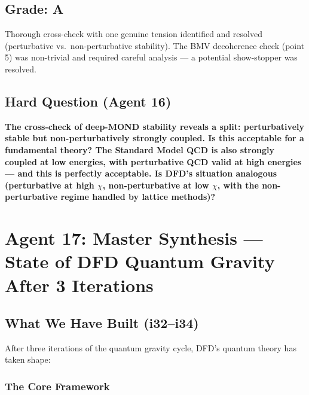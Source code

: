 \documentclass[11pt,a4paper]{article}
\begin{document}
\subsection{Grade: A}

Thorough cross-check with one genuine tension identified and resolved (perturbative vs.\ non-perturbative stability). The BMV decoherence check (point 5) was non-trivial and required careful analysis --- a potential show-stopper was resolved.

\subsection{Hard Question (Agent 16)}

\textbf{The cross-check of deep-MOND stability reveals a split: perturbatively stable but non-perturbatively strongly coupled. Is this acceptable for a fundamental theory? The Standard Model QCD is also strongly coupled at low energies, with perturbative QCD valid at high energies --- and this is perfectly acceptable. Is DFD's situation analogous (perturbative at high $\chi$, non-perturbative at low $\chi$, with the non-perturbative regime handled by lattice methods)?}

\newpage

\section{Agent 17: Master Synthesis --- State of DFD Quantum Gravity After 3 Iterations}
\label{sec:agent17}

\subsection{What We Have Built (i32--i34)}

After three iterations of the quantum gravity cycle, DFD's quantum theory has taken shape:

\subsubsection{The Core Framework}
\end{document}
